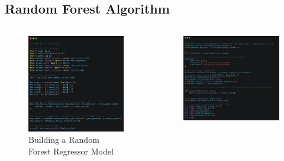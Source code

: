 \documentclass{beamer}
\begin{document}
\subsection{Random Forest Algorithm}
\begin{frame}
    \begin{columns}[onlytextwidth]
    \begin{column}{.45\textwidth}
        \begin{figure}
            \includegraphics[width=\textwidth]{img/code1-edited.png}
            \caption*{Building a Random Forest Regressor Model}
        \end{figure}
    \end{column}
    \hfill
    \begin{column}{.45\textwidth}
        \begin{figure}
            \includegraphics[width=\textwidth]{img/code2-edited.png}

\end{figure}
\end{column}
\end{columns}
\end{frame}
\end{document}
